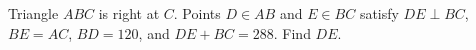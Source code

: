 Triangle $ABC$ is right at $C$. Points $D\in AB$ and $E\in BC$ satisfy $DE\perp BC$, $BE=AC$, $BD=120$, and $DE+BC=288$. Find $DE$.
